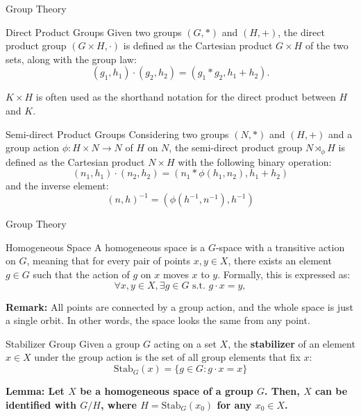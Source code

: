 \documentclass[9pt,dvipsnames]{beamer}
\begin{document}
\begin{frame}{Group Theory}

	\begin{block}{Direct Product Groups}
		Given two groups $(G, \ast)$ and $(H, +)$, the direct product group $(G \times H, \cdot)$ is defined as the Cartesian product $G \times H$ of the two sets, along with the group law:
		\begin{equation*}
			(g_1, h_1) \cdot (g_2, h_2) = (g_1 \ast g_2, h_1 + h_2).
		\end{equation*}

		$K \times H$ is often used as the shorthand notation for the direct product between $H$ and $K$.

	\end{block}

	\begin{block}{Semi-direct Product Groups}
		Considering two groups $(N, *)$ and $(H, +)$ and a group action $\phi : H \times N \to N$ of $H$ on $N$, the semi-direct product group $N \rtimes_\phi H$ is defined as the Cartesian product $N \times H$ with the following binary operation:
		\begin{equation*}
			(n_1, h_1) \cdot (n_2, h_2) = (n_1 * \phi(h_1, n_2), h_1 + h_2)
		\end{equation*}
		and the inverse element:
		\begin{equation*}
			(n, h)^{-1} = (\phi(h^{-1}, n^{-1}), h^{-1})
		\end{equation*}
	\end{block}
\end{frame}
\begin{frame}{Group Theory}
	\begin{block}{Homogeneous Space}
		A homogeneous space is a $G$-space with a transitive action on $G$, meaning that for every pair of points $x, y \in X$, there exists an element $g \in G$ such that the action of $g$ on $x$ moves $x$ to $y$. Formally, this is expressed as:
		\begin{equation*}
			\forall x, y \in X, \exists g \in G \text{ s.t. } g \cdot x = y,
		\end{equation*}
	\end{block}

	\textbf{Remark:} All points are connected by a group action, and the whole space is just a single orbit. In other words, the space looks the same from any point.

	\begin{block}{Stabilizer Group}
		Given a group $G$ acting on a set $X$, the \textbf{stabilizer} of an element $x \in X$ under the group action is the set of all group elements that fix $x$:
		\begin{equation*}
			\text{Stab}_G(x) = \{g \in G : g \cdot x = x\}
		\end{equation*}
	\end{block}

	\textbf{Lemma: Let $X$ be a homogeneous space of a group $G$. Then, $X$ can be identified with $G/H$, where $H = \mathrm{Stab}_G(x_0)$ for any $x_0 \in X$.}

\end{frame}
\end{document}
